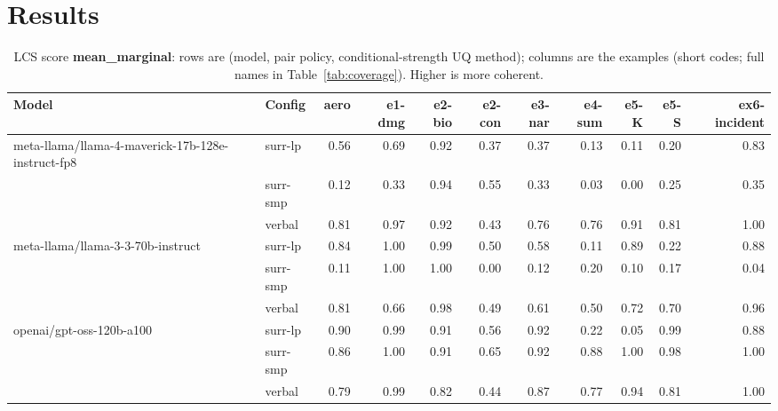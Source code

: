 \documentclass[11pt]{article}
\begin{document}
\section{Results}

\begin{table}[htbp]
\centering
\footnotesize
\setlength{\tabcolsep}{3.5pt}
\caption{LCS score \textbf{mean\_marginal}: rows are (model, pair policy, conditional-strength UQ method); columns are the examples (short codes; full names in Table~\ref{tab:coverage}). Higher is more coherent.}
\label{tab:mean-marginal}
\begin{tabular}{llrrrrrrrrr}
\toprule
\textbf{Model} & \textbf{Config} & \textbf{aero} & \textbf{e1-dmg} & \textbf{e2-bio} & \textbf{e2-con} & \textbf{e3-nar} & \textbf{e4-sum} & \textbf{e5-K} & \textbf{e5-S} & \textbf{ex6-incident} \\
\midrule
meta-llama/llama-4-maverick-17b-128e-instruct-fp8 & surr-lp & 0.56 & 0.69 & 0.92 & 0.37 & 0.37 & 0.13 & 0.11 & 0.20 & 0.83 \\
 & surr-smp & 0.12 & 0.33 & 0.94 & 0.55 & 0.33 & 0.03 & 0.00 & 0.25 & 0.35 \\
 & verbal & 0.81 & 0.97 & 0.92 & 0.43 & 0.76 & 0.76 & 0.91 & 0.81 & 1.00 \\
\midrule
meta-llama/llama-3-3-70b-instruct & surr-lp & 0.84 & 1.00 & 0.99 & 0.50 & 0.58 & 0.11 & 0.89 & 0.22 & 0.88 \\
 & surr-smp & 0.11 & 1.00 & 1.00 & 0.00 & 0.12 & 0.20 & 0.10 & 0.17 & 0.04 \\
 & verbal & 0.81 & 0.66 & 0.98 & 0.49 & 0.61 & 0.50 & 0.72 & 0.70 & 0.96 \\
\midrule
openai/gpt-oss-120b-a100 & surr-lp & 0.90 & 0.99 & 0.91 & 0.56 & 0.92 & 0.22 & 0.05 & 0.99 & 0.88 \\
 & surr-smp & 0.86 & 1.00 & 0.91 & 0.65 & 0.92 & 0.88 & 1.00 & 0.98 & 1.00 \\
 & verbal & 0.79 & 0.99 & 0.82 & 0.44 & 0.87 & 0.77 & 0.94 & 0.81 & 1.00 \\
\bottomrule
\end{tabular}
\end{table}
\end{document}
